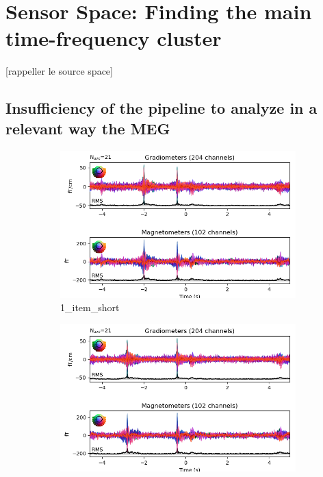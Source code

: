 
\section{Sensor Space: Finding the main time-frequency cluster}

[rappeller le source space]

\subsection{Insufficiency of the pipeline to analyze in a relevant way the MEG}

\begin{figure}[htb]
    \centering %
    \begin{subfigure}{0.25\textwidth}
        \includegraphics[width=\linewidth]{images_report/sensor/evoked/1_item_short.png}
        \caption{1\_item\_short}
        \label{fig:1_item_short}
    \end{subfigure}\hfil %
    \begin{subfigure}{0.25\textwidth}
        \includegraphics[width=\linewidth]{images_report/sensor/evoked/1_item_medium.png}

\end{subfigure}
\end{figure}
